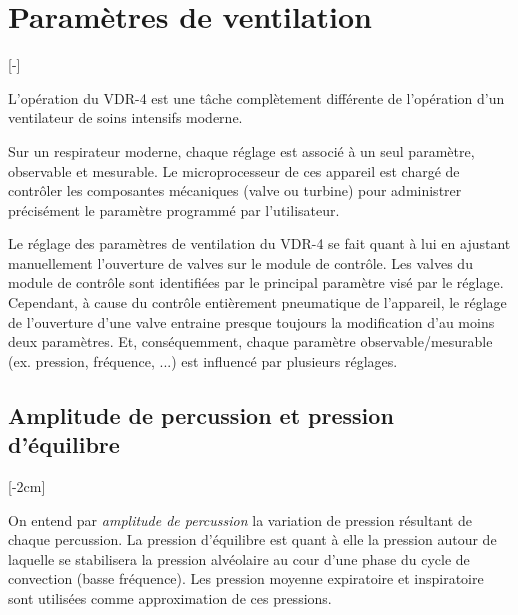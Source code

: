 \chapter{Paramètres de ventilation}

[-\baselineskip]

L'opération du VDR-4 est une tâche complètement différente de
l'opération d'un ventilateur de soins intensifs moderne.

Sur un respirateur moderne, chaque réglage est associé à un seul
paramètre, observable et mesurable. Le microprocesseur de ces appareil
est chargé de contrôler les composantes mécaniques (valve ou turbine)
pour administrer précisément le paramètre programmé par l'utilisateur.

Le réglage des paramètres de ventilation du VDR-4 se fait quant à lui
en ajustant manuellement l'ouverture de valves sur le module de
contrôle.  Les valves du module de contrôle sont identifiées par le
principal paramètre visé par le réglage.  Cependant, à cause du
contrôle entièrement pneumatique de l'appareil, le réglage de
l'ouverture d'une valve entraine presque toujours la modification d'au
moins deux paramètres. Et, conséquemment, chaque paramètre
observable/mesurable (ex. pression, fréquence, ...) est influencé par
plusieurs réglages.

\section[Amplitude de percussion]{Amplitude de percussion et pression d'équilibre}

	[-2cm]

On entend par	\emph{amplitude de percussion} la variation de pression
	résultant de chaque percussion. La pression d'équilibre est quant à
	elle la pression autour de laquelle se stabilisera la pression
	alvéolaire au cour d'une phase du cycle de convection (basse
	fréquence). Les pression moyenne expiratoire et inspiratoire sont
	utilisées comme approximation de ces pressions.

